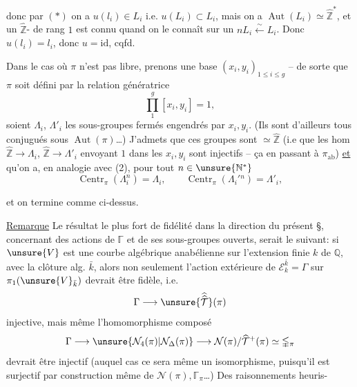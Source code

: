 
donc par $(*)$ on a $u(l_i)\in L_i$ i.e. $u(L_i)\subset L_i$,
mais on a $\operatorname{Aut}(L_i)\simeq\widehat{\mathbb Z}^{*}$, et un
  
$\widehat{\mathbb Z}$-  de rang $1$
 est connu quand on le connaît
sur un $nL_i\xleftarrow{\sim}L_i$.
Donc  $u(l_i)=l_i$,
donc $u=\mathrm{id}$, cqfd.

Dans le cas où $\pi$ n'est pas libre,
prenons une  base $(x_i,y_i)_{1\leq i\leq g}$
-- de sorte que $\pi$ soit défini par la relation génératrice
\[
\tag{3} \prod_1^g[x_i,y_i]=1,
\]
soient $\Lambda_i$, $\Lambda'_i$ les sous-groupes fermés
engendrés par $x_i,y_i$.
 (Ils sont d'ailleurs tous conjugués sous
$\operatorname{Aut}(\pi)$\ldots) J'admets que ces groupes
sont $\simeq\widehat{\mathbb Z}$ (i.e que les hom
 $\widehat{\mathbb Z}\longrightarrow\Lambda_i$,
$\widehat{\mathbb Z}\longrightarrow\Lambda'_i$ envoyant $1$ dans les
$x_i,y_i$ sont injectifs -- ça 
 en passant à $\pi_{\mathrm{ab}}$)
\uline{et} qu'on a, en analogie avec (2), pour
tout $n\in\unsure{\mathbb N^{*}}$
\[
\tag{4}
\operatorname{Centr}_{\pi}(\Lambda_i^n)=\Lambda_i,\qquad
\operatorname{Centr}_{\pi}(\Lambda_i'{}^n)=\Lambda'_i,
\]


et on termine comme ci-dessus.

\uline{Remarque} Le résultat le plus fort de
fidélité dans la direction du présent
\S, concernant des actions de $\mathbb{\Gamma}$ et de
ses sous-groupes ouverts, serait le
suivant: si $\unsure{V}$ est une courbe
algébrique anabélienne sur l'extension
finie $k$ de $\mathbb Q$, avec la clôture alg. $\bar k$,
alors non seulement l'action extérieure
de $\mathcal E_k^{\bar k}=\Gamma$ sur
$\pi_1(\unsure{V}_{\bar k})$ devrait être
fidèle, i.e.
\[
\Gamma\longrightarrow\unsure{\widehat{\widehat{\mathcal T}}}(\pi)
\]
injective, mais même l'homomorphisme
composé
\[
\Gamma\longrightarrow
\unsure{\mathcal N_4(\pi)|\mathcal N_{\Delta}(\pi)}
\longrightarrow\mathcal N(\pi)/\widehat{\mathcal T}^{+}(\pi)
\simeq\mathbb{\Gamma}_{\pi}
\]
devrait être injectif (auquel cas ce sera
même un isomorphisme, puisqu'il est
surjectif par construction même de
$\mathcal N(\pi),\mathbb{\Gamma}_{\pi}$\ldots)
Des raisonnements heuris-

